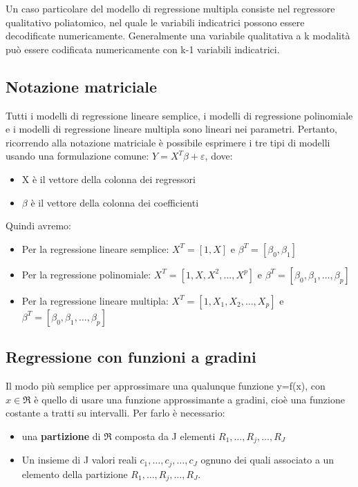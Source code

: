 \documentclass[a4paper]{extarticle}
\begin{document}
Un caso particolare del modello di regressione multipla consiste nel regressore qualitativo poliatomico, nel quale le variabili indicatrici possono essere decodificate numericamente. Generalmente una variabile qualitativa a k modalità può essere codificata numericamente con k-1 variabili indicatrici.

\subsection{Notazione matriciale}

Tutti i modelli di regressione lineare semplice, i modelli di regressione polinomiale e i modelli di regressione lineare multipla sono lineari nei parametri. Pertanto, ricorrendo alla notazione matriciale è possibile esprimere i tre tipi di modelli usando una formulazione comune: $Y = X^T \beta + \varepsilon$, dove:

\begin{itemize}
\item X è il vettore della colonna dei regressori
\item $\beta$ è il vettore della colonna dei coefficienti
\end{itemize}

Quindi avremo:

\begin{itemize}
\item Per la regressione lineare semplice: $X^T = [1,X]$ e $\beta^T = [ \beta_0, \beta_1 ]$
\item Per la regressione polinomiale: $X^T = [1,X,X^2,\dots,X^p]$ e $\beta^T = [\beta_0,\beta_1,\dots,\beta_p]$
\item Per la regressione lineare multipla: $X^T = [1,X_1,X_2,\dots,X_p]$ e $\beta^T = [\beta_0,\beta_1,\dots, \beta_p]$ 
\end{itemize}

\subsection{Regressione con funzioni a gradini}

Il modo più semplice per approssimare una qualunque funzione y=f(x), con $x \in \Re$ è quello di usare una funzione approssimante a gradini, cioè una funzione costante a tratti su intervalli. Per farlo è necessario:
\begin{itemize}
\item una \textbf{partizione} di $\Re$ composta da J elementi ${R_1, \dots, R_j,\dots, R_J}$
\item Un insieme di J valori reali ${c_1,\dots,c_j,\dots,c_J}$ ognuno dei quali associato a un elemento della partizione ${R_1, \dots, R_j,\dots, R_J}$.
\end{itemize}
\end{document}
